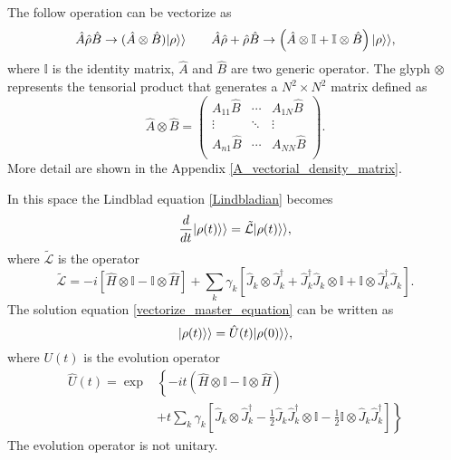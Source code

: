 The follow operation can be vectorize as
\begin{equation}
    \hat A \hat\rho \hat B \rightarrow (\hat A\otimes\hat B)\lvert\rho\rangle\rangle \qquad \hat A \hat\rho +\hat\rho\hat B \rightarrow \left(\hat A\otimes\mathbb{I} +\mathbb{I}\otimes\hat B\right)\lvert\rho\rangle\rangle,
\end{equation}
where $\mathbb{I}$ is the identity matrix, $\hat A$ and $\hat B$ are two generic operator. The glyph $\otimes$ represents the tensorial product that generates a $N^2\times N^2$ matrix defined as
\begin{equation}
    \hat A\otimes\hat B = \begin{pmatrix}
        A_{11} \hat B & \cdots & A_{1N}\hat B\\
        \vdots & \ddots &\vdots\\
        A_{n1}\hat B& \cdots & A_{NN}\hat B\\
    \end{pmatrix}.
\end{equation}
More detail are shown in the Appendix \ref{A_vectorial_density_matrix}.

In this space the Lindblad equation \eqref{Lindbladian} becomes
\begin{equation}\label{vectorize_master_equation}
    \frac{d}{dt}\lvert\rho(t)\rangle\rangle = \tilde{\mathcal{L}}\lvert\rho(t)\rangle\rangle,
\end{equation}
where $\tilde{\mathcal{L}}$ is the operator 
\begin{equation}
    \tilde{\mathcal{L}}=-i\left[\hat H\otimes\mathbb{I}-\mathbb{I}\otimes\hat H\right]+\sum_{k}\gamma_{k}\left[\hat J_{k}\otimes\hat J^\dagger_{k} + \hat J_{k}^\dagger \hat J_{k}\otimes\mathbb{I} +\mathbb{I}\otimes\hat J_{k}^\dagger \hat J_{k}\right].
\end{equation}
The solution equation \eqref{vectorize_master_equation} can be written as
\begin{equation}
    \lvert\rho(t)\rangle\rangle = \hat U(t)\lvert\rho(0)\rangle\rangle,
\end{equation}
where $U(t)$ is the evolution operator
\begin{equation}
    \begin{split}
        \hat U(t) = \exp&\left\{-it\left(\hat H\otimes\mathbb{I}-\mathbb{I}\otimes\hat H\right)\right.\\
        &+\left. t\sum_{k}\gamma_{k}\left[ \hat J_{k}\otimes\hat J^\dagger_{k}-\frac{1}{2}\hat J_{k}\hat J^\dagger_{k}\otimes\mathbb{I}-\frac{1}{2}\mathbb{I}\otimes\hat J_{k}\hat J^\dagger_{k}\right]\right\}
    \end{split}
\end{equation}
The evolution operator is not unitary.

